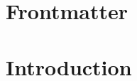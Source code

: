 

\setcounter{chapter}{0}
\setcounter{section}{0}


\newcommand{\toroidal}{\t}
\newcommand{\extendedtoroidal}{\hat{\t}}
\newcommand{\simpleroots}{\mathbb{I}}
\renewcommand{\positive}{+}
\renewcommand{\negative}{-}
\newcommand{\divzero}{\der_{\gamma}(A)}



    

    \newpage

    \chapter*{Frontmatter}
        \minitoc
    
        \newpage
    
        
    
        \newpage
    
        
    
        \newpage
    
        

    \newpage

    {
      \hypersetup{} 
      \dominitoc
      \tableofcontents %
    }

    \newpage

    \chapter{Introduction}
        \newpage
    
        

        \newpage

        

    \newpage
    
